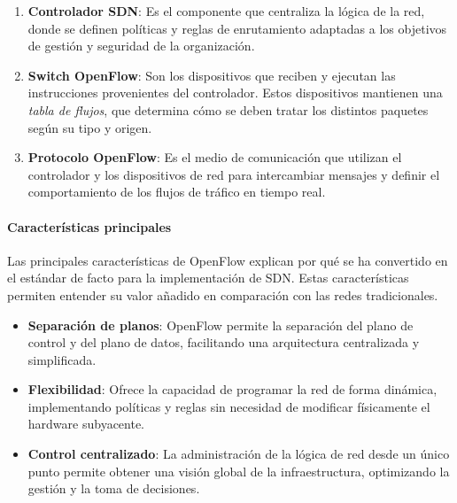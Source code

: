 {                    \begin{enumerate}
                        \item \textbf{Controlador SDN}: Es el componente que centraliza la lógica de la red, donde se definen políticas y reglas de enrutamiento adaptadas a los objetivos de gestión y seguridad de la organización.
                        
                        \item \textbf{Switch OpenFlow}: Son los dispositivos que reciben y ejecutan las instrucciones provenientes del controlador. Estos dispositivos mantienen una \textit{tabla de flujos}, que determina cómo se deben tratar los distintos paquetes según su tipo y origen.
                        
                        \item \textbf{Protocolo OpenFlow}: Es el medio de comunicación que utilizan el controlador y los dispositivos de red para intercambiar mensajes y definir el comportamiento de los flujos de tráfico en tiempo real.
                    \end{enumerate}
                
                \paragraph{Características principales}
                    Las principales características de OpenFlow explican por qué se ha convertido en el estándar de facto para la implementación de SDN. Estas características permiten entender su valor añadido en comparación con las redes tradicionales.
                    
                    \begin{itemize}
                        \item \textbf{Separación de planos}: OpenFlow permite la separación del plano de control y del plano de datos, facilitando una arquitectura centralizada y simplificada.
                        
                        \item \textbf{Flexibilidad}: Ofrece la capacidad de programar la red de forma dinámica, implementando políticas y reglas sin necesidad de modificar físicamente el hardware subyacente.
                        
                        \item \textbf{Control centralizado}: La administración de la lógica de red desde un único punto permite obtener una visión global de la infraestructura, optimizando la gestión y la toma de decisiones.
                        

\end{itemize}}
